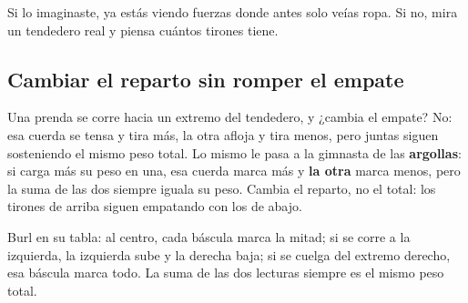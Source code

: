 \documentclass[
  spanish,
  letterpaper,
  12pt,
  oneside,
  open=any,
  DIV=15]{scrbook}
\begin{document}
\begin{tcolorbox}[enhanced jigsaw, arc=.35mm, bottomrule=.15mm, bottomtitle=1mm, breakable, colback=white, colbacktitle=quarto-callout-tip-color!10!white, colframe=quarto-callout-tip-color-frame, coltitle=black, left=2mm, leftrule=.75mm, opacityback=0, opacitybacktitle=0.6, rightrule=.15mm, title=\textcolor{quarto-callout-tip-color}{\faLightbulb}\hspace{0.5em}{Sobre la pregunta socioemocional}, titlerule=0mm, toprule=.15mm, toptitle=1mm]

Si lo imaginaste, ya estás viendo fuerzas donde antes solo veías ropa.
Si no, mira un tendedero real y piensa cuántos tirones tiene.

\end{tcolorbox}

\subsection{Cambiar el reparto sin romper el
empate}\label{cambiar-el-reparto-sin-romper-el-empate}

Una prenda se corre hacia un extremo del tendedero, y ¿cambia el empate?
No: esa cuerda se tensa y tira más, la otra afloja y tira menos, pero
juntas siguen sosteniendo el mismo peso total. Lo mismo le pasa a la
gimnasta de las \textcolor[HTML]{7C3AED}{\textbf{argollas}}: si carga
más su peso en una, esa cuerda marca más y
\textcolor[HTML]{2563EB}{\textbf{la otra}} marca menos, pero la suma de
las dos siempre iguala su peso. Cambia el reparto, no el total: los
tirones de arriba siguen empatando con los de abajo.

\begin{tcolorbox}[enhanced jigsaw, arc=.35mm, bottomrule=.15mm, bottomtitle=1mm, breakable, colback=white, colbacktitle=quarto-callout-note-color!10!white, colframe=quarto-callout-note-color-frame, coltitle=black, left=2mm, leftrule=.75mm, opacityback=0, opacitybacktitle=0.6, rightrule=.15mm, title=\textcolor{quarto-callout-note-color}{\faInfo}\hspace{0.5em}{Apoyo Visual}, titlerule=0mm, toprule=.15mm, toptitle=1mm]

Burl en su tabla: al centro, cada báscula marca la mitad; si se corre a
la izquierda, la izquierda sube y la derecha baja; si se cuelga del
extremo derecho, esa báscula marca todo. La suma de las dos lecturas
siempre es el mismo peso total.

\end{tcolorbox}
\end{document}

